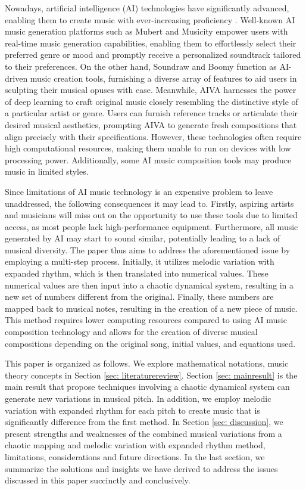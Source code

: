 \documentclass[11pt]{article}
\theoremstyle{definition}
\begin{document}
Nowadays, artificial intelligence (AI) technologies have significantly advanced, enabling them to create music with ever-increasing proficiency \cite{bonnici_music_2021}. 
Well-known AI music generation platforms such as  Mubert \cite{mubert_website} and 
Musicity \cite{musicfy_website} empower users with real-time music generation capabilities, 
enabling them to effortlessly select their preferred genre or mood and promptly receive a personalized soundtrack tailored to their preferences. On the other hand, Soundraw \cite{soundraw_website} and Boomy \cite{boomy_website} function as AI-driven music creation tools, furnishing a diverse array of features to aid users in sculpting their musical opuses with ease. Meanwhile, AIVA \cite{aiva_website} harnesses the power of deep learning to craft original music closely resembling the distinctive style of a particular artist or genre. Users can furnish reference tracks or articulate their desired musical aesthetics, prompting AIVA to generate fresh compositions that align precisely with their specifications. However, these technologies often require high computational resources, making them unable to run on devices with low processing power. Additionally, some AI music composition tools may produce music in limited styles.

Since limitations of AI music technology is an expensive problem to leave unaddressed, the following consequences it may lead to. Firstly, aspiring artists and musicians will miss out on the opportunity to use these tools due to limited access, as most people lack high-performance equipment. Furthermore, all music generated by AI may start to sound similar, potentially leading to a lack of musical diversity. The paper thus aims to address the aforementioned issue by employing a multi-step process. Initially, it utilizes melodic variation with expanded rhythm, which is then translated into numerical values. These numerical values are then input into a chaotic dynamical system, resulting in a new set of numbers different from the original. Finally, these numbers are mapped back to musical notes, resulting in the creation of a new piece of music. This method requires lower computing resources compared to using AI music composition technology and allows for the creation of diverse musical compositions depending on the original song, initial values, and equations used.

This paper is organized as follows. We explore mathematical notations, music theory concepts in Section \ref{sec: literaturereview}. Section \ref{sec: mainresult} is the main result that propose techniques involving a chaotic dynamical system can generate new variations in musical pitch. In addition, we employ melodic variation with expanded rhythm for each pitch to create music that is significantly difference from the first method. In Section \ref{sec: discussion}, we present strengths and weaknesses of the combined musical variations from a chaotic mapping and melodic variation with expanded rhythm method, limitations, considerations and future directions. In the last section,  we summarize the solutions and insights we have derived to address the issues discussed in this paper succinctly and conclusively.
\end{document}
